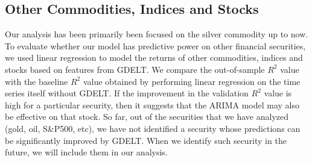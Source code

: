 \subsection{Other Commodities, Indices and Stocks}
Our analysis has been primarily been focused on the silver commodity up to now. To evaluate whether our model has predictive power on other financial securities, we used linear regression to model the returns of other commodities, indices and stocks based on features from GDELT. We compare the out-of-sample $R^2$ value with the baseline $R^2$ value obtained by performing linear regression on the time series itself without GDELT. If the improvement in the validation $R^2$ value is high for a particular security, then it suggests that the ARIMA model may also be effective on that stock. So far, out of the securities that we have analyzed (gold, oil, S\&P500, etc), we have not identified a security whose predictions can be significantly improved by GDELT. When we identify such security in the future, we will include them in our analysis.

